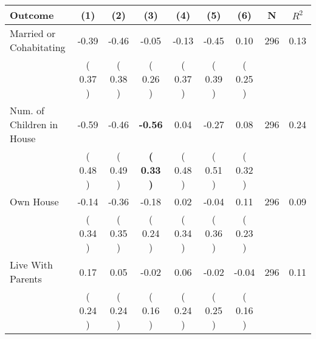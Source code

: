 \begin{tabular}{lcccccccc}
\toprule
 \textbf{Outcome} & \textbf{(1)} & \textbf{(2)} & \textbf{(3)} & \textbf{(4)} & \textbf{(5)} & \textbf{(6)} & \textbf{N} & \textbf{$ R^2$} \\
\midrule
Married or Cohabitating &     -0.39 &     -0.46 &     -0.05 &     -0.13 &     -0.45 &      0.10 & 296 &       0.13 \\ 
 & (     0.37 ) & (     0.38 ) & (     0.26 ) & (     0.37 ) & (     0.39 ) & (     0.25 ) & \\
Num. of Children in House &     -0.59 &     -0.46 & \textbf{    -0.56} &      0.04 &     -0.27 &      0.08 & 296 &       0.24 \\ 
 & (     0.48 ) & (     0.49 ) & \textbf{(     0.33 )} & (     0.48 ) & (     0.51 ) & (     0.32 ) & \\
Own House &     -0.14 &     -0.36 &     -0.18 &      0.02 &     -0.04 &      0.11 & 296 &       0.09 \\ 
 & (     0.34 ) & (     0.35 ) & (     0.24 ) & (     0.34 ) & (     0.36 ) & (     0.23 ) & \\
Live With Parents &      0.17 &      0.05 &     -0.02 &      0.06 &     -0.02 &     -0.04 & 296 &       0.11 \\ 
 & (     0.24 ) & (     0.24 ) & (     0.16 ) & (     0.24 ) & (     0.25 ) & (     0.16 ) & \\
\bottomrule
\end{tabular}

